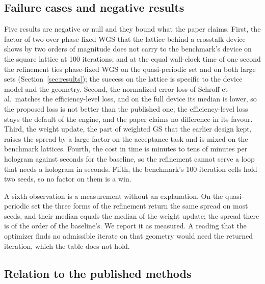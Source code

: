 \subsection{Failure cases and negative results}

Five results are negative or null and they bound what the paper claims. First, the factor of two over phase-fixed WGS that the lattice behind a crosstalk device shows by two orders of magnitude does not carry to the benchmark's device on the square lattice at 100 iterations, and at the equal wall-clock time of one second the refinement ties phase-fixed WGS on the quasi-periodic set and on both large sets (Section~\ref{sec:results}); the success on the lattice is specific to the device model and the geometry. Second, the normalized-error loss of Schroff et al.\ matches the efficiency-level loss, and on the full device its median is lower, so the proposed loss is not better than the published one; the efficiency-level loss stays the default of the engine, and the paper claims no difference in its favour. Third, the weight update, the part of weighted GS that the earlier design kept, raises the spread by a large factor on the acceptance task and is mixed on the benchmark lattices. Fourth, the cost in time is minutes to tens of minutes per hologram against seconds for the baseline, so the refinement cannot serve a loop that needs a hologram in seconds. Fifth, the benchmark's 100-iteration cells hold two seeds, so no factor on them is a win.

A sixth observation is a measurement without an explanation. On the quasi-periodic set the three forms of the refinement return the same spread on most seeds, and their median equals the median of the weight update; the spread there is of the order of the baseline's. We report it as measured. A reading that the optimizer finds no admissible iterate on that geometry would need the returned iteration, which the table does not hold.

\subsection{Relation to the published methods}

